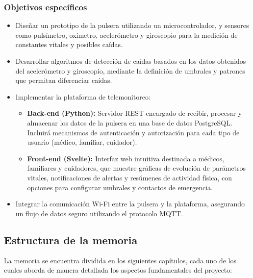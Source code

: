 \documentclass[12pt, a4paper]{article}
\begin{document}
	\subsubsection{Objetivos específicos}
	\begin{itemize}
		\item Diseñar un prototipo de la pulsera utilizando un microcontrolador, y sensores como pulsímetro, oxímetro, acelerómetro y giroscopio para la medición de constantes vitales y posibles caídas.
		
		\item Desarrollar algoritmos de detección de caídas basados en los datos obtenidos del acelerómetro y giroscopio, mediante la definición de umbrales y patrones que permitan diferenciar caídas.
		
		\item Implementar la plataforma de telemonitoreo:
		\begin{itemize}
			\item \textbf{Back-end (Python):} Servidor REST encargado de recibir, procesar y almacenar los datos de la pulsera en una base de datos PostgreSQL. Incluirá mecanismos de autenticación y autorización para cada tipo de usuario (médico, familiar, cuidador).
			
			\item \textbf{Front-end (Svelte):} Interfaz web intuitiva destinada a médicos, familiares y cuidadores, que muestre gráficas de evolución de parámetros vitales, notificaciones de alertas y resúmenes de actividad física, con opciones para configurar umbrales y contactos de emergencia.
		\end{itemize}
		
		\item Integrar la comunicación Wi-Fi entre la pulsera y la plataforma, asegurando un flujo de datos seguro utilizando el protocolo MQTT.
		
		
	\end{itemize}

	
	\subsection{Estructura de la memoria}
	
	La memoria se encuentra dividida en los siguientes capítulos, cada uno de los cuales aborda de manera detallada los aspectos fundamentales del proyecto:
	
\end{document}
